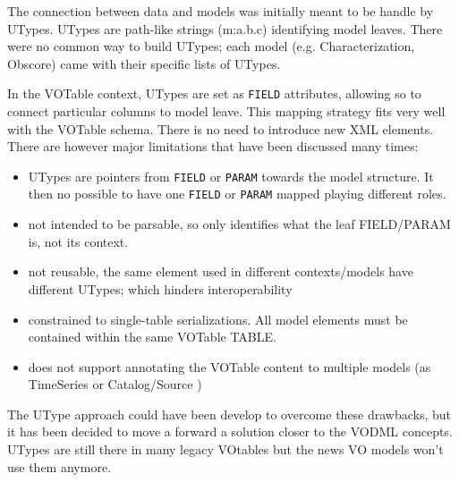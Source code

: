 The connection between data and models was initially meant to be handle by UTypes.
UTypes are path-like strings (m:a.b.c) identifying model leaves. There were no common way to build UTypes; each model (e.g. Characterization, Obscore)  came with their specific lists of UTypes. 

In the VOTable context, UTypes are set as \texttt{FIELD} attributes, allowing so to connect particular columns to model leave. This mapping strategy fits very well with the VOTable schema. There is no need to introduce new XML elements. There are however major limitations that have been discussed many times:

\begin{itemize}
  \item UTypes are pointers from \texttt{FIELD} or \texttt{PARAM} towards the 
  model structure. It then no possible to have one  \texttt{FIELD} or
  \texttt{PARAM} mapped playing different roles.
  \item not intended to be parsable, so only identifies what the leaf 
  FIELD/PARAM is, not its context.
  \item not reusable, the same element used in different contexts/models 
  have different UTypes; which hinders interoperability
  \item constrained to single-table serializations. All model elements must 
  be contained within the same VOTable TABLE.
  \item does not support annotating the VOTable content to multiple models 
  (as TimeSeries or Catalog/Source )
\end{itemize}

The UType approach could have been develop to overcome these drawbacks, but it has been decided to move a forward a solution closer to the VODML concepts. UTypes are still there in many legacy VOtables  but the news VO models won't use them anymore.
